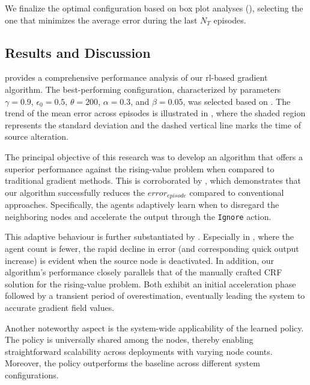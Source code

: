 We finalize the optimal configuration based on box plot analyses (), 
 selecting the one that minimizes the average error during the last $N_T$ episodes.


\subsection{Results and Discussion}
 provides a comprehensive performance analysis of our \acl{rl}-based gradient algorithm. 
 The best-performing configuration, characterized by parameters \(\gamma = 0.9\), \(\epsilon_0 = 0.5\), \(\theta = 200\), \(\alpha = 0.3\), and \(\beta = 0.05\), was selected based on . 
 The trend of the mean error across episodes is illustrated in , where the shaded region represents the standard deviation and the dashed vertical line marks the time of source alteration.

The principal objective of this research was to develop an algorithm that offers a superior performance against the rising-value problem when compared to traditional gradient methods. 
 This is corroborated by , which demonstrates that our algorithm successfully reduces the \(error_{episode}\) compared to conventional approaches. 
 Specifically, the agents adaptively learn when to disregard the neighboring nodes and accelerate the output through the \lstinline|Ignore| action.

This adaptive behaviour is further substantiated by . Especially in , 
 where the agent count is fewer, the rapid decline in error (and corresponding quick output increase) is evident when the source node is deactivated. 
 In addition, our algorithm's performance closely parallels that of the manually crafted CRF solution for the rising-value problem. 
 Both exhibit an initial acceleration phase followed by a transient period of overestimation, eventually leading the system to accurate gradient field values.

Another noteworthy aspect is the system-wide applicability of the learned policy. The policy is universally shared among the nodes, 
 thereby enabling straightforward scalability across deployments with varying node counts. 
 Moreover, the policy outperforms the baseline across different system configurations.

